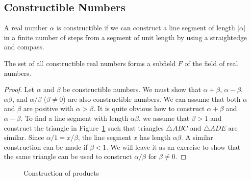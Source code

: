  

\subsection*{Constructible Numbers}
 

A real number $\alpha$ is {\bfi constructible\/} if we can construct a line segment of length $| \alpha |$ in a
finite number of steps from a segment of unit length by using a
straightedge and compass.  
 

\begin{theorem}\label{fields:construct_num_ther}
The set of all constructible real numbers forms a subfield $F$ of the
field of real numbers. 
\end{theorem}
 
 
\begin{proof}
Let $\alpha$ and $\beta$ be constructible numbers.  We must show that
$\alpha + \beta$, $\alpha - \beta$, $\alpha \beta$, and $\alpha /
\beta$ ($\beta \neq 0$) are also constructible numbers. We can assume
that both $\alpha$ and $\beta$ are positive with $\alpha > \beta$. It
is quite obvious how to construct $\alpha + \beta$ and $\alpha -
\beta$. To find a line segment with length $\alpha \beta$, we assume
that $\beta > 1$ and construct the triangle in Figure~\ref{Multiply}
such that triangles $\triangle ABC$ and $\triangle ADE$ are similar.
Since $\alpha / 1 = x / \beta$, the line segment $x$ has length
$\alpha \beta$.  A similar construction can be made if $\beta <1$. We
will leave it as an exercise to show that the same triangle can be
used to construct $\alpha / \beta$ for $\beta \neq 0$.  
\end{proof}

\begin{figure}[htb]
\begin{center}

\end{center}
\caption{Construction of products}
\label{Multiply}
\end{figure}


